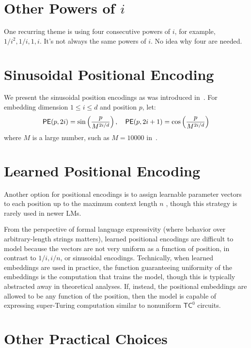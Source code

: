 \section{Other Powers of $i$}

One recurring theme is using four consecutive powers of $i$, for example, $1/i^2, 1/i, 1, i$. It's not always the same powers of $i$. No idea why four are needed.


\section{Sinusoidal Positional Encoding}

We present the sinusoidal position encodings as was introduced in~\citet{vaswani-etal-2017-attention}.
For embedding dimension \(1 \leq i \leq d\) and position \(p\), let:
\begin{align*}
    \mathsf{PE}(p, 2i) = \sin\left(\frac{p}{M^{2i/d}}\right),
    \quad
    \mathsf{PE}(p, 2i+1) = \cos\left(\frac{p}{M^{2i/d}}\right)
\end{align*}
where \(M\) is a large number, such as \(M = 10000\) in~\citet{vaswani-etal-2017-attention}.


\section{Learned Positional Encoding}

Another option for positional encodings is to assign learnable parameter vectors to each position up to the maximum context length $n$ \citep{vaswani-etal-2017-attention}, though this strategy is rarely used in newer LMs.

From the perspective of formal language expressivity (where behavior over arbitrary-length strings matters), learned positional encodings are difficult to model because the vectors are not very uniform as a function of position, in contrast to $1/i, i/n$, or sinusoidal encodings.
Technically, when learned embeddings are used in practice, the function guaranteeing uniformity of the embeddings is the computation that trains the model, though this is typically abstracted away in theoretical analyses.
If, instead, the positional embeddings are allowed to be any function of the position, then the model is capable of expressing super-Turing computation similar to nonuniform $\mathsf{TC}^0$ circuits.

\section{Other Practical Choices}

